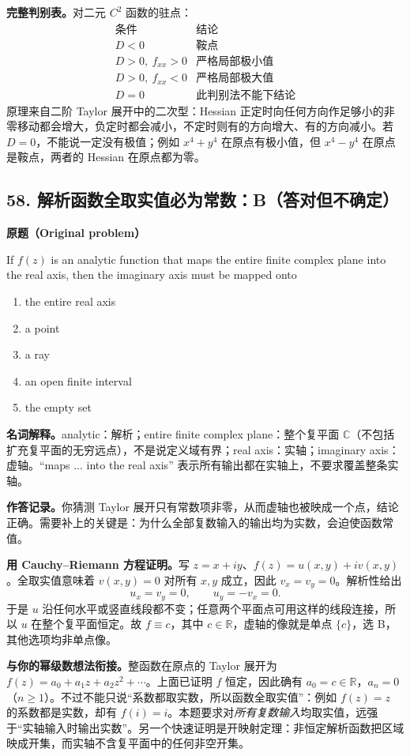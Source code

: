 \documentclass[11pt,a4paper,fontset=fandol]{ctexart}
\begin{document}
\textbf{完整判别表。}对二元 $C^2$ 函数的驻点：
\[
\begin{array}{c|c}
\text{条件}&\text{结论}\\\hline
D<0&\text{鞍点}\\
D>0,\ f_{xx}>0&\text{严格局部极小值}\\
D>0,\ f_{xx}<0&\text{严格局部极大值}\\
D=0&\text{此判别法不能下结论}
\end{array}
\]
原理来自二阶 Taylor 展开中的二次型：Hessian 正定时向任何方向作足够小的非零移动都会增大，负定时都会减小，不定时则有的方向增大、有的方向减小。若 $D=0$，不能说一定没有极值；例如 $x^4+y^4$ 在原点有极小值，但 $x^4-y^4$ 在原点是鞍点，两者的 Hessian 在原点都为零。

\subsection{58. 解析函数全取实值必为常数：B（答对但不确定）}
\label{p4:q58}
\textbf{原题（Original problem）}

If $f(z)$ is an analytic function that maps the entire finite complex plane into the real axis, then the imaginary axis must be mapped onto
\begin{enumerate}[label=(\Alph*)]
\item the entire real axis
\item a point
\item a ray
\item an open finite interval
\item the empty set
\end{enumerate}
\textbf{名词解释。}analytic：解析；entire finite complex plane：整个复平面 $\mathbb C$（不包括扩充复平面的无穷远点），不是说定义域有界；real axis：实轴；imaginary axis：虚轴。``maps ... into the real axis'' 表示所有输出都在实轴上，不要求覆盖整条实轴。

\textbf{作答记录。}你猜测 Taylor 展开只有常数项非零，从而虚轴也被映成一个点，结论正确。需要补上的关键是：为什么全部复数输入的输出均为实数，会迫使函数常值。

\textbf{用 Cauchy--Riemann 方程证明。}写 $z=x+iy$、$f(z)=u(x,y)+iv(x,y)$。全取实值意味着 $v(x,y)=0$ 对所有 $x,y$ 成立，因此 $v_x=v_y=0$。解析性给出
\[
u_x=v_y=0,\qquad u_y=-v_x=0.
\]
于是 $u$ 沿任何水平或竖直线段都不变；任意两个平面点可用这样的线段连接，所以 $u$ 在整个复平面恒定。故 $f\equiv c$，其中 $c\in\mathbb R$，虚轴的像就是单点 $\{c\}$，选 B，其他选项均非单点像。

\textbf{与你的幂级数想法衔接。}整函数在原点的 Taylor 展开为 $f(z)=a_0+a_1z+a_2z^2+\cdots$。上面已证明 $f$ 恒定，因此确有 $a_0=c\in\mathbb R$，$a_n=0$（$n\ge1$）。不过不能只说“系数都取实数，所以函数全取实值”：例如 $f(z)=z$ 的系数都是实数，却有 $f(i)=i$。本题要求对\emph{所有复数输入}均取实值，远强于“实轴输入时输出实数”。另一个快速证明是开映射定理：非恒定解析函数把区域映成开集，而实轴不含复平面中的任何非空开集。
\end{document}
